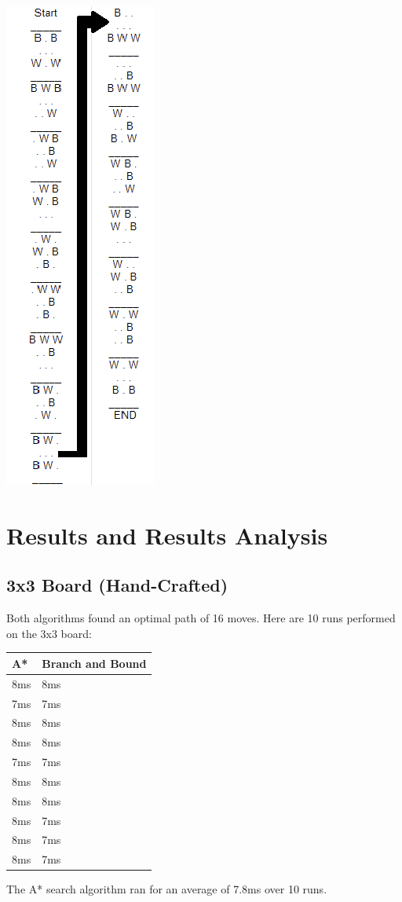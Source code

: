 \documentclass[12pt, letterpaper, final, onecolumn, titlepage] {article}
\begin{document}
\begin{multicols}{2}
\includegraphics[scale=1]{bnbPath.png}
\end{multicols}
\newpage


\newpage

\section{Results and Results Analysis}
\subsection{3x3 Board (Hand-Crafted)}
Both algorithms found an optimal path of 16 moves.  Here are 10 runs performed on the 3x3 board:
\begin{center}
\begin{tabular}{|p{4cm}|p{4cm}|}
\hline
\textbf{A*} & \textbf{Branch and Bound} \\
\hline
8ms & 8ms \\
\hline
7ms & 7ms \\
\hline
8ms & 8ms \\
\hline
8ms & 8ms \\
\hline
7ms & 7ms \\
\hline
8ms & 8ms \\
\hline
8ms & 8ms \\
\hline
8ms & 7ms \\
\hline
8ms & 7ms \\
\hline
8ms & 7ms \\
\hline
\end{tabular}
\end{center}
\noindent The A* search algorithm ran for an average of 7.8ms over 10 runs.
\end{document}
